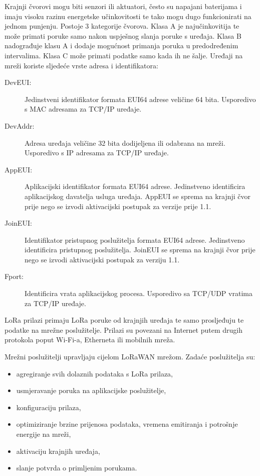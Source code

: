 \documentclass[times, utf8, diplomski]{fer}
\begin{document}
Krajnji čvorovi mogu biti senzori ili aktuatori, često su napajani baterijama i imaju visoku razinu energetske učinkovitosti te tako mogu dugo funkcionirati na jednom punjenju. Postoje 3 kategorije čvorova. Klasa A je najučinkovitija te može primati poruke samo nakon uspješnog slanja poruke s uređaja. Klasa B nadograđuje klasu A i dodaje mogućnost primanja poruka u predodređenim intervalima. Klasa C može primati podatke samo kada ih ne šalje. Uređaji na mreži koriste sljedeće vrste adresa i identifikatora:
\begin{description}
    \item[DevEUI:]Jedinstveni identifikator formata EUI64  adrese veličine 64 bita. Usporedivo s MAC adresama za TCP/IP uređaje.
    \item[DevAddr:]Adresa uređaja veličine 32 bita dodijeljena ili odabrana na mreži. Usporedivo s IP adresama za TCP/IP uređaje.
    \item[AppEUI:]Aplikacijski identifikator formata EUI64 adrese. Jedinstveno identificira aplikacijskog davatelja usluga uređaja. AppEUI se sprema na krajnji čvor prije nego se izvodi aktivacijski postupak za verzije prije 1.1.
    \item[JoinEUI:]Identifikator pristupnog poslužitelja formata EUI64 adrese. Jedinstveno identificira pristupnog poslužitelja. JoinEUI se sprema na krajnji čvor prije nego se izvodi aktivacijski postupak za verziju 1.1.
    \item[Fport:]Identificira vrata aplikacijskog procesa. Usporedivo sa TCP/UDP vratima za TCP/IP uređaje.
\end{description}

LoRa prilazi primaju LoRa poruke od krajnjih uređaja te samo prosljeđuju te podatke na mrežne poslužitelje. Prilazi su povezani na Internet putem drugih protokola poput Wi-Fi-a, Etherneta ili mobilnih mreža.

Mrežni poslužitelji upravljaju cijelom LoRaWAN mrežom. Zadaće poslužitelja su:
\begin{itemize}
    \item agregiranje svih dolaznih podataka s LoRa prilaza,
    \item usmjeravanje poruka na aplikacijske poslužitelje,
    \item konfiguraciju prilaza,
    \item optimiziranje brzine prijenosa podataka, vremena emitiranja i potrošnje energije na mreži,
    \item aktivaciju krajnjih uređaja,
    \item slanje potvrda o primljenim porukama.
\end{itemize}
\end{document}
